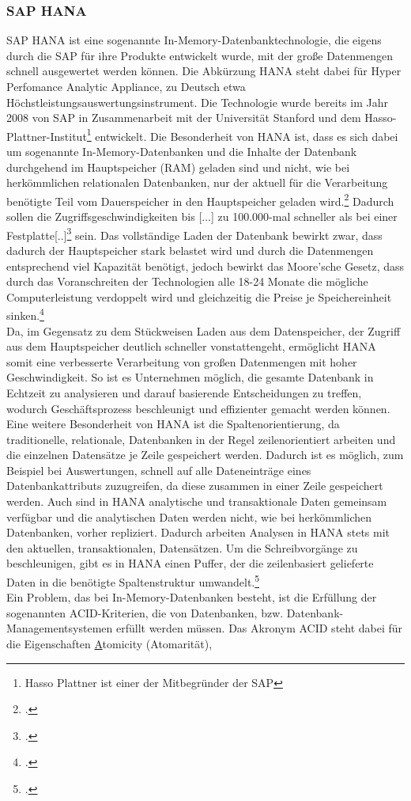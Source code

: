 \subsubsection{SAP HANA}
\label{kap:HANA}
SAP HANA ist eine sogenannte \glqq{}In-Memory\grqq{}-Datenbanktechnologie, die eigens durch die SAP für ihre Produkte entwickelt wurde, mit der große Datenmengen schnell ausgewertet werden können. Die Abkürzung HANA steht dabei für \glqq{}Hyper Perfomance Analytic Appliance\grqq{}, zu Deutsch etwa \glqq{}Höchstleistungsauswertungsinstrument\grqq{}. Die Technologie wurde bereits im Jahr 2008 von SAP in Zusammenarbeit mit der Universität Stanford und dem Hasso-Plattner-Institut\footnote{Hasso Plattner ist einer der Mitbegründer der SAP} entwickelt. Die Besonderheit von HANA ist, dass es sich dabei um sogenannte \glqq{}In-Memory-Datenbanken\grqq{} und die Inhalte der Datenbank durchgehend im Hauptspeicher (RAM) geladen sind und nicht, wie bei herkömmlichen relationalen Datenbanken, nur der aktuell für die Verarbeitung benötigte Teil vom Dauerspeicher in den Hauptspeicher geladen wird.\footcite[Vgl.][]{was-hana} Dadurch sollen die Zugriffsgeschwindigkeiten bis \glqq{}[...] zu 100.000-mal schneller als bei einer Festplatte[..]\grqq{}\footcite[Vgl.][]{rz10-hana} sein. Das vollständige Laden der Datenbank bewirkt zwar, dass dadurch der Hauptspeicher stark belastet wird und durch die Datenmengen entsprechend viel Kapazität benötigt, jedoch bewirkt das Moore'sche Gesetz, dass durch das Voranschreiten der Technologien alle 18-24 Monate die mögliche Computerleistung verdoppelt wird und gleichzeitig die Preise je Speichereinheit sinken.\footcite[Vgl.][]{mooresches}\\ Da, im Gegensatz zu dem Stückweisen Laden aus dem Datenspeicher, der Zugriff aus dem Hauptspeicher deutlich schneller vonstattengeht, ermöglicht HANA somit eine verbesserte Verarbeitung von großen Datenmengen mit hoher Geschwindigkeit. So ist es Unternehmen möglich, die gesamte Datenbank in Echtzeit zu analysieren und darauf basierende Entscheidungen zu treffen, wodurch Geschäftsprozess beschleunigt und effizienter gemacht werden können. Eine weitere Besonderheit von HANA ist die Spaltenorientierung, da traditionelle, relationale, Datenbanken in der Regel zeilenorientiert arbeiten und die einzelnen Datensätze je Zeile gespeichert werden. Dadurch ist es möglich, zum Beispiel bei Auswertungen, schnell auf alle Dateneinträge eines Datenbankattributs zuzugreifen, da diese zusammen in einer Zeile gespeichert werden. Auch sind in HANA analytische und transaktionale Daten gemeinsam verfügbar und die analytischen Daten werden nicht, wie bei herkömmlichen Datenbanken, vorher repliziert. Dadurch arbeiten Analysen in HANA stets mit den aktuellen, transaktionalen, Datensätzen. Um die Schreibvorgänge zu beschleunigen, gibt es in HANA einen Puffer, der die zeilenbasiert gelieferte Daten in die benötigte Spaltenstruktur umwandelt.\footcite[Vgl.][]{was-hana}\\Ein Problem, das bei In-Memory-Datenbanken besteht, ist die Erfüllung der sogenannten ACID-Kriterien, die von Datenbanken, bzw. Datenbank-Managementsystemen erfüllt werden müssen. Das Akronym \glqq{}ACID\grqq{} steht dabei für die Eigenschaften \underline{A}tomicity (Atomarität), 